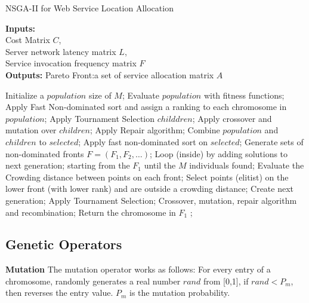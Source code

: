 \begin{algorithm}[!htb]
	\caption{NSGA-II for Web Service Location Allocation}
	\footnotesize
	\label{alg:NSGA2}
	\textbf{Inputs:} \\
		Cost Matrix $C$, \\ 
		Server network latency matrix $L$, \\
		Service invocation frequency matrix $F$ \\

	\textbf{Outputs:}
		Pareto Front:a  set of service allocation matrix $A$

	\begin{algorithmic}[1]
		\State Initialize a $population$ size of $M$;
		\State Evaluate $population$ with fitness functions;
		\State Apply Fast Non-dominated sort and assign a ranking to each chromosome in $population$;
		\State Apply Tournament Selection $childdren$;
		\State Apply crossover and mutation  over $children$;
		\State Apply Repair algorithm;
		\State Combine $population$ and $children$ to $selected$;
		    \State Apply fast non-dominated sort on $selected$;
		    \State Generate sets of non-dominated fronts $F = (F_1, F_2, \dots)$;
		    \State Loop (inside) by adding solutions to next generation;
		    \State starting from the $F_1$ until the $M$ individuals found;
		    \State Evaluate the Crowding distance between points on each front;
		    \State Select points (elitist) on the lower front (with lower rank) and are outside a crowding distance;
		    \State Create next generation;
		    \State Apply Tournament Selection;
		    \State Crossover, mutation, repair algorithm and recombination;
		\EndWhile
		\State Return the chromosome in $F_1$ ;
	\end{algorithmic}
\end{algorithm}



\subsection{Genetic Operators}
% 

\begin{flushleft}\textbf{Mutation} The mutation operator works as follows: For every entry of a chromosome, randomly generates a real number $rand$ from [0,1],
 if $rand < P_m$, then reverses the entry value. $P_m$ is the mutation probability.
\end{flushleft}


